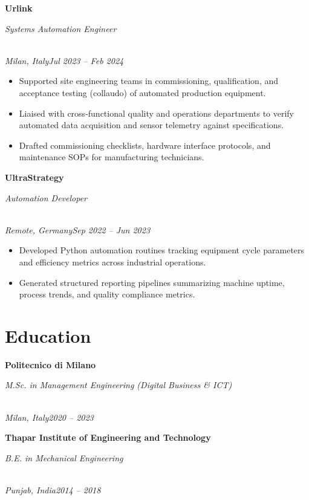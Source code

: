\documentclass[a4paper,10pt]{article}
\newcommand{\role}[4]{\vspace{3pt}\noindent\hspace{0.6em}\parbox[t]{0.38\textwidth}{\raggedright\textbf{#1}}\hfill\parbox[t]{0.58\textwidth}{\raggedleft\textit{#2}}\\{\textit{#3}\hfill\textit{#4}}\vspace{1pt}}
\begin{document}
\role{Urlink}{Systems Automation Engineer}{Milan, Italy}{Jul 2023 -- Feb 2024}
\begin{itemize}
\item Supported site engineering teams in commissioning, qualification, and acceptance testing (collaudo) of automated production equipment.
\item Liaised with cross-functional quality and operations departments to verify automated data acquisition and sensor telemetry against specifications.
\item Drafted commissioning checklists, hardware interface protocols, and maintenance SOPs for manufacturing technicians.
\end{itemize}

\role{UltraStrategy}{Automation Developer}{Remote, Germany}{Sep 2022 -- Jun 2023}
\begin{itemize}
\item Developed Python automation routines tracking equipment cycle parameters and efficiency metrics across industrial operations.
\item Generated structured reporting pipelines summarizing machine uptime, process trends, and quality compliance metrics.
\end{itemize}

\section{Education}
\role{Politecnico di Milano}{M.Sc. in Management Engineering (Digital Business \& ICT)}{Milan, Italy}{2020 -- 2023}
\role{Thapar Institute of Engineering and Technology}{B.E. in Mechanical Engineering}{Punjab, India}{2014 -- 2018}
\end{document}
